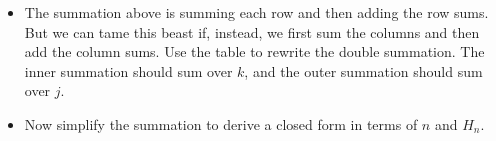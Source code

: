 \documentclass[12pt]{article}
\begin{document}
\begin{itemize}
\item The summation above is summing each row and then adding the row
  sums.  But we can tame this beast if, instead, we first sum the
  columns and then add the column sums. Use the table to rewrite the
  double summation. The inner summation should sum over $k$, and the
  outer summation should sum over $j$.


\item Now simplify the summation to derive a closed form in terms of
  $n$ and $H_n$.


\end{itemize}
\end{document}
